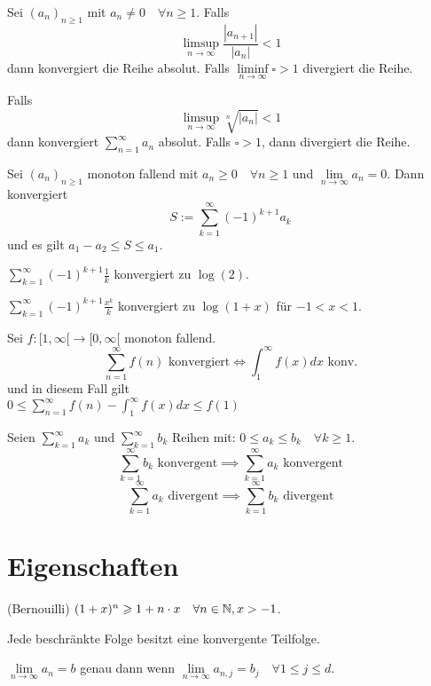 \Satz[Ratio] Sei $\left(a_{n}\right)_{n \geqslant 1}$ mit $a_{n} \neq 0 \quad \forall n \geqslant 1 .$ Falls 
$$\limsup\limits_{n \rightarrow \infty} \frac{\left|a_{n+1}\right|}{\left|a_{n}\right|}<1$$ dann konvergiert die Reihe absolut.
Falls $\liminf\limits_{n \rightarrow \infty}\square > 1$ divergiert die Reihe.

\Satz[Root] Falls $$\limsup\limits_{n \rightarrow \infty} \sqrt[n]{\left|a_{n}\right|}<1$$ dann konvergiert $\sum_{n=1}^{\infty} a_{n}$ absolut. Falls $\square > 1$, dann divergiert die Reihe.

\Satz[Alternating] Sei $\left(a_{n}\right)_{n \geqslant 1}$ monoton fallend mit $a_{n} \geqslant 0 \quad \forall n \geqslant 1$ und $\lim \limits_{n \rightarrow \infty} a_{n}=0 .$ Dann konvergiert 
$$S:=\sum_{k=1}^{\infty}(-1)^{k+1} a_{k}$$ und es gilt $a_{1}-a_{2} \leqslant S \leqslant a_{1}$.

\Bsp $\sum_{k=1}^{\infty}(-1)^{k+1} \frac{1}{k}$ konvergiert zu $\log(2)$.

\Bsp $\sum_{k=1}^{\infty}(-1)^{k+1} \frac{x^k}{k}$ konvergiert zu $\log(1+x)$ für $-1<x<1$.

\Satz[McLaurin] Sei $f:[1,\infty[ \longrightarrow [0, \infty[$ monoton fallend.
$$ \sum_{n=1}^\infty f(n) \text{ konvergiert} \Longleftrightarrow \int_1^\infty f(x) dx \text{ konv.}$$
und in diesem Fall gilt \\
$ 0 \leq \sum_{n=1}^\infty f(n) - \int_1^\infty f(x) dx \leq f(1)$

\Korollar[Vergleichssatz] Seien $\sum_{k=1}^{\infty} a_{k}$ und $\sum_{k=1}^{\infty} b_{k}$ Reihen mit: $0 \leq a_{k} \leq b_{k} \quad \forall k \geq 1. $
\[ \sum_{k=1}^{\infty} b_{k} \text{ konvergent} \implies \sum_{k=1}^{\infty} a_{k} \text{ konvergent} \]
\[ \sum_{k=1}^{\infty} a_{k} \text{ divergent} \implies \sum_{k=1}^{\infty} b_{k} \text{ divergent} \]


\section{Eigenschaften}
\Lemma (Bernouilli) $(1+x)^{n} \geqslant 1+n \cdot x \quad \forall n \in \mathbb{N}, x>-1$.

\Satz[Teilfolge] Jede beschränkte Folge besitzt eine konvergente Teilfolge.

\Satz[Vektorfolge] $\lim \limits_{n \rightarrow \infty} a_{n}=b$ genau dann wenn $\lim \limits_{n \rightarrow \infty} a_{n, j}=b_{j} \quad \forall 1 \leqslant j \leqslant d$.

